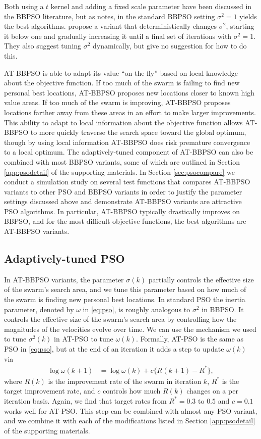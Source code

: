 \documentclass[cmbright]{staauth}
\begin{document}
Both using a $t$ kernel and adding a fixed scale parameter have been discussed in the BBPSO literature, but as \cite{kennedy2003bare} notes, in the standard BBPSO setting $\sigma^2=1$ yields the best algorithms. \cite{hsieh2010modified} propose a variant that deterministically changes $\sigma^2$, starting it below one and gradually increasing it until a final set of iterations with $\sigma^2=1$. They also suggest tuning $\sigma^2$ dynamically, but give no suggestion for how to do this.

AT-BBPSO is able to adapt its value ``on the fly'' based on local knowledge about the objective function. If too much of the swarm is failing to find new personal best locations, AT-BBPSO proposes new locations closer to known high value areas. If too much of the swarm is improving, AT-BBPSO proposes locations farther away from these areas in an effort to make larger improvements. This ability to adapt to local information about the objective function allows AT-BBPSO to more quickly traverse the search space toward the global optimum, though by using local information AT-BBPSO does risk premature convergence to a local optimum. The adaptively-tuned component of AT-BBPSO can also be combined with most BBPSO variants, some of which are outlined in Section \ref{app:psodetail} of the supporting materials. In Section \ref{sec:psocompare} we conduct a simulation study on several test functions that compares AT-BBPSO variants to other PSO and BBPSO variants in order to justify the parameter settings discussed above and demonstrate AT-BBPSO variants are attractive PSO algorithms. In particular, AT-BBPSO typically drastically improves on BBPSO, and for the most difficult objective functions, the best algorithms are AT-BBPSO variants.

\subsection{Adaptively-tuned PSO}\label{sec:AT-PSO}
In AT-BBPSO variants, the parameter $\sigma(k)$ partially controls the effective size of the swarm's search area, and we tune this parameter based on how much of the swarm is finding new personal best locations. In standard PSO the inertia parameter, denoted by $\omega$ in \eqref{eq:pso}, is roughly analogous to $\sigma^2$ in BBPSO. It controls the effective size of the swarm's search area by controlling how the magnitudes of the velocities evolve over time. We can use the mechanism we used to tune $\sigma^2(k)$ in AT-PSO to tune $\omega(k)$. Formally, AT-PSO is the same as PSO in \eqref{eq:pso}, but at the end of an iteration it adds a step to update $\omega(k)$ via
\begin{align}\label{eq:atpso}
\log\omega(k+1)& = \log\omega(k) + c \{R(k+1) - R^*\},
\end{align}
where $R(k)$ is the improvement rate of the swarm in iteration $k$, $R^*$ is the target improvement rate, and $c$ controls how much $R(k)$ changes on a per iteration basis. Again, we find that target rates from $R^*=0.3$ to $0.5$ and $c=0.1$ works well for AT-PSO.  This step can be combined with almost any PSO variant, and we combine it with each of the modifications listed in Section \ref{app:psodetail} of the supporting materials.
\end{document}
